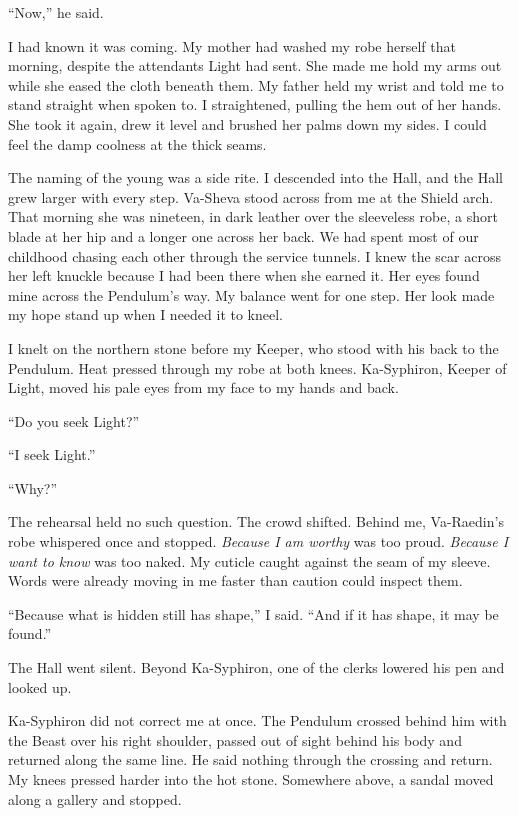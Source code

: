 ``Now,'' he said.\par

I had known it was coming. My mother had washed my robe herself that morning, despite the attendants Light had sent. She made me hold my arms out while she eased the cloth beneath them. My father held my wrist and told me to stand straight when spoken to. I straightened, pulling the hem out of her hands. She took it again, drew it level and brushed her palms down my sides. I could feel the damp coolness at the thick seams.\par

The naming of the young was a side rite. I descended into the Hall, and the Hall grew larger with every step. Va-Sheva stood across from me at the Shield arch. That morning she was nineteen, in dark leather over the sleeveless robe, a short blade at her hip and a longer one across her back. We had spent most of our childhood chasing each other through the service tunnels. I knew the scar across her left knuckle because I had been there when she earned it. Her eyes found mine across the Pendulum's way. My balance went for one step. Her look made my hope stand up when I needed it to kneel.\par

I knelt on the northern stone before my Keeper, who stood with his back to the Pendulum. Heat pressed through my robe at both knees. Ka-Syphiron, Keeper of Light, moved his pale eyes from my face to my hands and back.\par

``Do you seek Light?''\par
``I seek Light.''\par
``Why?''\par

The rehearsal held no such question. The crowd shifted. Behind me, Va-Raedin's robe whispered once and stopped. \textit{Because I am worthy} was too proud. \textit{Because I want to know} was too naked. My cuticle caught against the seam of my sleeve. Words were already moving in me faster than caution could inspect them.\par

``Because what is hidden still has shape,'' I said. ``And if it has shape, it may be found.''\par

The Hall went silent. Beyond Ka-Syphiron, one of the clerks lowered his pen and looked up.\par

Ka-Syphiron did not correct me at once. The Pendulum crossed behind him with the Beast over his right shoulder, passed out of sight behind his body and returned along the same line. He said nothing through the crossing and return. My knees pressed harder into the hot stone. Somewhere above, a sandal moved along a gallery and stopped.\par

